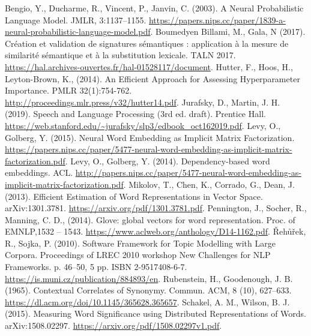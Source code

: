 \documentclass[11pt,french,french]{article}
\begin{document}
\begin{thebibliography}{999}
 Bengio, Y., Ducharme, R., Vincent, P., Janvin, C. (2003). A Neural Probabilistic Language Model. JMLR, 3:1137–1155. \url{https://papers.nips.cc/paper/1839-a-neural-probabilistic-language-model.pdf}.
 Boumedyen Billami, M.,  Gala, N (2017). Création et validation de signatures sémantiques : application à la mesure de similarité sémantique et à la substitution lexicale. TALN 2017. \url{https://hal.archives-ouvertes.fr/hal-01528117/document}.
 Hutter, F., Hoos, H., Leyton-Brown, K., (2014). An Efficient Approach for Assessing Hyperparameter Importance. PMLR 32(1):754-762. \url{http://proceedings.mlr.press/v32/hutter14.pdf}.
 Jurafsky, D., Martin, J. H. (2019). Speech and Language Processing (3rd ed. draft). Prentice Hall. \url{https://web.stanford.edu/~jurafsky/slp3/edbook_oct162019.pdf}.
 Levy, O., Golberg, Y. (2015). Neural Word Embedding as Implicit Matrix Factorization.
\url{https://papers.nips.cc/paper/5477-neural-word-embedding-as-implicit-matrix-factorization.pdf}.
 Levy, O., Golberg, Y. (2014). Dependency-based word embeddings. ACL. \url{http://papers.nips.cc/paper/5477-neural-word-embedding-as-implicit-matrix-factorization.pdf}.
 Mikolov, T.,  Chen, K., Corrado, G., Dean, J. (2013). Efficient Estimation of Word Representations in Vector Space. arXiv:1301.3781. \url{https://arxiv.org/pdf/1301.3781.pdf}.
 Pennington, J., Socher, R., Manning, C. D., (2014).  Glove: global vectors for word representation. Proc. of EMNLP,1532 – 1543. \url{https://www.aclweb.org/anthology/D14-1162.pdf}.
 {\v R}eh{\r u}{\v r}ek, R.,  Sojka, P. (2010). Software Framework for Topic Modelling with Large Corpora. Proceedings of LREC 2010 workshop New Challenges for NLP Frameworks. p. 46--50, 5 pp. ISBN 2-9517408-6-7. \url{https://is.muni.cz/publication/884893/en}.
 Rubenstein, H.,  Goodenough, J. B. (1965). Contextual Correlates of Synonymy. Commun. ACM, 8 (10), 627–633. \url{https://dl.acm.org/doi/10.1145/365628.365657}.
 Schakel, A. M., Wilson, B. J. (2015). Measuring Word Significance using Distributed Representations of Words. arXiv:1508.02297. \url{https://arxiv.org/pdf/1508.02297v1.pdf}.
\end{thebibliography}
\end{document}
